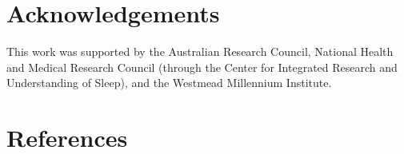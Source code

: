 \documentclass[preprint,review,10pt,authoryear,letterpaper]{elsarticle}
\begin{document}

\section{Acknowledgements}
\label{sec:acknowledgements}
This work was supported by the Australian Research Council, National Health and Medical Research Council (through the Center for Integrated Research and Understanding of Sleep), and the Westmead Millennium Institute.

\section{References}


\end{document}
